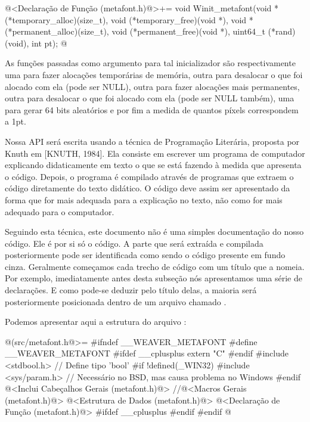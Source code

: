 \iniciocodigo
@<Declaração de Função (metafont.h)@>+=
void Winit_metafont(void *(*temporary_alloc)(size_t),
                    void (*temporary_free)(void *),
                    void *(*permanent_alloc)(size_t),
                    void (*permanent_free)(void *),
                    uint64_t (*rand)(void), int pt);
@
\fimcodigo

As funções passadas como argumento para tal inicializador são
respectivamente uma para fazer alocações temporárias de memória, outra
para desalocar o que foi alocado com ela (pode ser NULL), outra para
fazer alocações mais permanentes, outra para desalocar o que foi
alocado com ela (pode ser NULL também), uma para gerar 64 bits
aleatórios e por fim a medida de quantos píxels correspondem a 1pt.



Nossa API será escrita usando a técnica de Programação Literária,
proposta por Knuth em [KNUTH, 1984]. Ela consiste em escrever um
programa de computador explicando didaticamente em texto o que se está
fazendo à medida que apresenta o código. Depois, o programa é
compilado através de programas que extraem o código diretamente do
texto didático. O código deve assim ser apresentado da forma que for
mais adequada para a explicação no texto, não como for mais adequado
para o computador.

Seguindo esta técnica, este documento não é uma simples documentação
do nosso código. Ele é por si só o código. A parte que será extraída e
compilada posteriormente pode ser identificada como sendo o código
presente em fundo cinza. Geralmente começamos cada trecho de código
com um título que a nomeia. Por exemplo, imediatamente antes desta
subseção nós apresentamos uma série de declarações. E como pode-se
deduzir pelo título delas, a maioria será posteriormente posicionada
dentro de um arquivo chamado .

Podemos apresentar aqui a estrutura do arquivo
:

\iniciocodigo
@(src/metafont.h@>=
#ifndef __WEAVER_METAFONT
#define __WEAVER_METAFONT
#ifdef __cplusplus
extern "C" {
#endif
#include <stdbool.h> // Define tipo 'bool'
#if !defined(_WIN32)
#include <sys/param.h> // Necessário no BSD, mas causa problema no Windows
#endif
@<Inclui Cabeçalhos Gerais (metafont.h)@>
//@<Macros Gerais (metafont.h)@>
@<Estrutura de Dados (metafont.h)@>
@<Declaração de Função (metafont.h)@>
#ifdef __cplusplus
}
#endif
#endif
@
\fimcodigo

